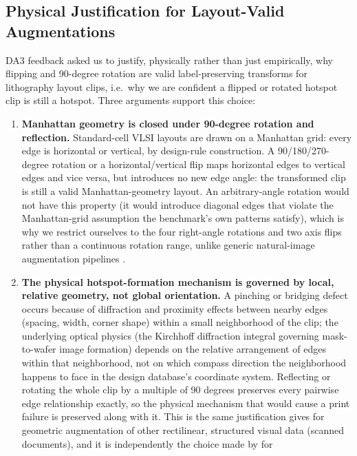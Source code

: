 \documentclass[conference]{IEEEtran}
\begin{document}
\subsection{Physical Justification for Layout-Valid Augmentations}
\label{sec:physical-aug}
DA3 feedback asked us to justify, physically rather than just
empirically, why flipping and 90-degree rotation are valid
label-preserving transforms for lithography layout clips, i.e.\ why
we are confident a flipped or rotated hotspot clip is still a hotspot.
Three arguments support this choice:

\begin{enumerate}
  \item \textbf{Manhattan geometry is closed under 90-degree rotation
  and reflection.} Standard-cell VLSI layouts are drawn on a Manhattan
  grid: every edge is horizontal or vertical, by design-rule
  construction. A 90/180/270-degree rotation or a horizontal/vertical
  flip maps horizontal edges to vertical edges and vice versa, but
  introduces no new edge angle: the transformed clip is still a
  valid Manhattan-geometry layout. An arbitrary-angle rotation would
  not have this property (it would introduce diagonal edges that
  violate the Manhattan-grid assumption the benchmark's own patterns
  satisfy), which is why we restrict ourselves to the four
  right-angle rotations and two axis flips rather than a continuous
  rotation range, unlike generic natural-image augmentation pipelines
  \cite{krizhevsky2012alexnet,cubuk2019autoaugment}.
  \item \textbf{The physical hotspot-formation mechanism is governed
  by local, relative geometry, not global orientation.} A pinching or
  bridging defect occurs because of diffraction and proximity effects
  between nearby edges (spacing, width, corner shape) within a small
  neighborhood of the clip; the underlying optical physics (the
  Kirchhoff diffraction integral governing mask-to-wafer image
  formation) depends on the relative arrangement of edges within that
  neighborhood, not on which compass direction the neighborhood
  happens to face in the design database's coordinate system.
  Reflecting or rotating the whole clip by a multiple of 90 degrees
  preserves every pairwise edge relationship exactly, so the
  physical mechanism that would cause a print failure is preserved
  along with it. This is the same justification
  \cite{simard2003bestpractices} gives for geometric augmentation of
  other rectilinear, structured visual data (scanned documents), and
  it is independently the choice made by \cite{yang2017imbalance} for

\end{enumerate}
\end{document}

